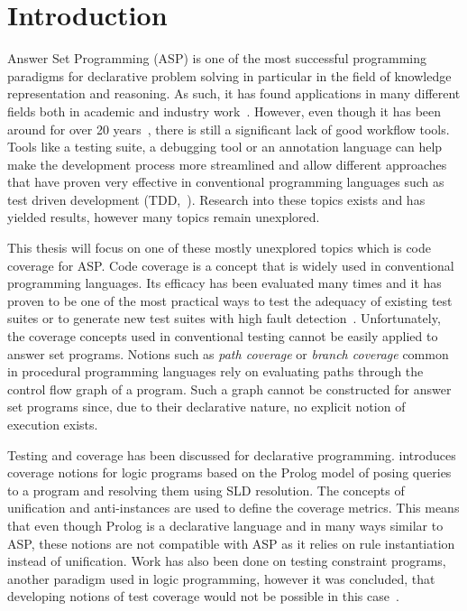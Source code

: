 \chapter{Introduction}
\label{ch:Introduction}
Answer Set Programming (ASP) is one of the most successful programming paradigms for declarative problem solving in particular in the field of knowledge representation and reasoning. As such, it has found applications in many different fields both in academic and industry work~\cite{EGL16}.
However, even though it has been around for over 20 years~\cite{Nie99, MT98}, there is still a significant lack of good workflow tools. Tools like a testing suite, a debugging tool or an annotation language can help make the development process more streamlined and allow different approaches that have proven very effective in conventional programming languages such as test driven development (TDD,~\cite{Fra+03}). Research into these topics exists and has yielded results, however many topics remain unexplored.

This thesis will focus on one of these mostly unexplored topics which is code coverage for ASP. Code coverage is a concept that is widely used in conventional programming languages. Its efficacy has been evaluated many times and it has proven to be one of the most practical ways to test the adequacy of existing test suites or to generate new test suites with high fault detection~\cite{GJG14}.
Unfortunately, the coverage concepts used in conventional testing cannot be easily applied to answer set programs. Notions such as \emph{path coverage} or \emph{branch coverage} common in procedural programming languages rely on evaluating paths through the control flow graph of a program. Such a graph cannot be constructed for answer set programs since, due to their declarative nature, no explicit notion of execution exists.

Testing and coverage has been discussed for declarative programming. \cite{BJ98} introduces coverage notions for logic programs based on the Prolog model of posing queries to a program and resolving them using SLD resolution. The concepts of unification and anti-instances are used to define the coverage metrics. This means that even though Prolog is a declarative language and in many ways similar to ASP, these notions are not compatible with ASP as it relies on rule instantiation instead of unification.
Work has also been done on testing constraint programs, another paradigm used in logic programming, however it was concluded, that developing notions of test coverage would not be possible in this case~\cite{LGL10}.

